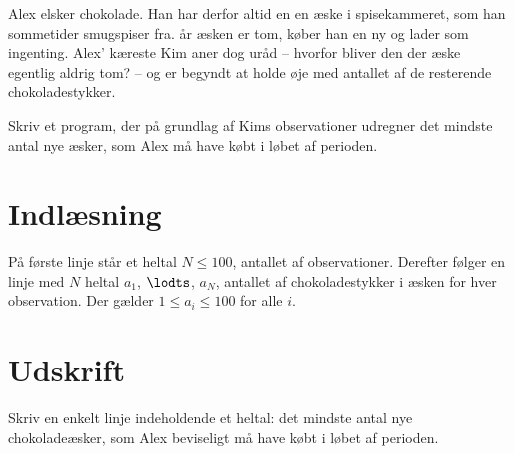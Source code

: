 Alex elsker chokolade.
Han har derfor altid en en æske i spisekammeret, som han sommetider smugspiser fra.
 år æsken er tom, køber han en ny og lader som ingenting.
Alex’ kæreste Kim aner dog uråd -- hvorfor bliver den der æske egentlig aldrig tom? -- og er begyndt at holde øje med antallet af de resterende chokoladestykker. 

Skriv et program, der på grundlag af Kims observationer udregner det mindste antal nye æsker, som Alex må have købt i løbet af perioden.

\section*{Indlæsning}

På første linje står et heltal $N \le 100$, antallet af observationer.
Derefter følger en linje med $N$ heltal $a_1$, $\lodts$, $a_N$, antallet af chokoladestykker i æsken for hver observation.
Der gælder $1\leq a_i\leq 100$ for alle $i$. 

\section*{Udskrift}
Skriv en enkelt linje indeholdende et heltal: det mindste antal nye chokoladeæsker, som Alex beviseligt må have købt i løbet af perioden.
